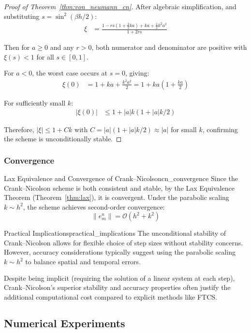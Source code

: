 \begin{proof}[Proof of Theorem~\ref{thm:von_neumann_cn}]
  After algebraic simplification, and substituting $s = \sin^2(\beta h/2)$:
  \begin{align*}
    \xi & = \frac{1 - rs(1 + \tfrac{3}{2}ka) + ka + \tfrac{1}{2}k^2a^2}{1 + 2rs}
  \end{align*}

  Then for $a \geq 0$ and any $r > 0$, both numerator and denominator are positive with $\xi(s) < 1$ for all $s \in [0,1]$.

  \medskip

  For $a < 0$, the worst case occurs at $s = 0$, giving:
  \begin{align*}
    \xi(0) & = 1 + ka + \frac{k^2a^2}{2} = 1 + ka\left(1 + \frac{ka}{2}\right)
  \end{align*}

  For sufficiently small $k$:
  \begin{align*}
    |\xi(0)| & \leq 1 + |a|k(1 + |a|k/2)
  \end{align*}

  Therefore, $|\xi| \leq 1 + Ck$ with $C = |a|(1 + |a|k/2) \approx |a|$ for small $k$, confirming the scheme is unconditionally stable.
\end{proof}

\subsubsection{Convergence}
\begin{theorem}{Lax Equivalence and Convergence of Crank--Nicolson}{cn_convergence}
  Since the Crank--Nicolson scheme is both consistent and stable, by the Lax Equivalence Theorem (Theorem~\ref{thm:lax}), it is convergent. Under the parabolic scaling $k \sim h^2$, the scheme achieves second-order convergence:
  \[
    \|e_m^n\| = \mathcal{O}\!\left(h^2 + k^2\right)
  \]
\end{theorem}

\begin{remark}{Practical Implications}{practical_implications}
  The unconditional stability of Crank--Nicolson allows for flexible choice of step sizes without stability concerns. However, accuracy considerations typically suggest using the parabolic scaling $k \sim h^2$ to balance spatial and temporal errors.

  Despite being implicit (requiring the solution of a linear system at each step), Crank--Nicolson's superior stability and accuracy properties often justify the additional computational cost compared to explicit methods like FTCS.
\end{remark}

\subsection{Numerical Experiments}

